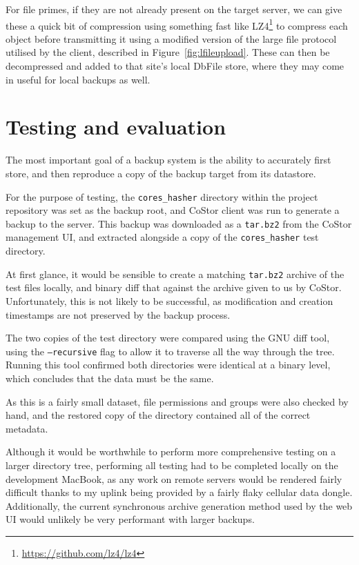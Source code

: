 \documentclass[bsc,frontabs,twoside,singlespacing,parskip,deptreport]{infthesis}     %
\begin{document}
For file primes, if they are not already present on the target server, we can give these a quick bit
of compression using something fast like LZ4\footnote{\url{https://github.com/lz4/lz4}} to compress
each object before transmitting it using a modified version of the large file protocol utilised by
the client, described in Figure~\ref{fig:lfileupload}. These can then be decompressed and added to that
site's local DbFile store, where they may come in useful for local backups as well.

\chapter{Testing and evaluation}

The most important goal of a backup system is the ability to accurately first store, and then reproduce
a copy of the backup target from its datastore.

For the purpose of testing, the \texttt{cores\_hasher} directory within the project repository was set
as the backup root, and CoStor client was run to generate a backup to the server. This backup was 
downloaded as a \texttt{tar.bz2} from the CoStor management UI, and extracted alongside a copy of
the \texttt{cores\_hasher} test directory.

At first glance, it would be sensible to create a matching \texttt{tar.bz2} archive of the test files
locally, and binary diff that against the archive given to us by CoStor. Unfortunately, this is not
likely to be successful, as modification and creation timestamps are not preserved by the backup 
process.

The two copies of the test directory were compared using the GNU diff tool, using the \texttt{--recursive}
flag to allow it to traverse all the way through the tree. Running this tool confirmed both
directories were identical at a binary level, which concludes that the data must be the same.

As this is a fairly small dataset, file permissions and groups were also checked by hand, and
the restored copy of the directory contained all of the correct metadata.

Although it would be worthwhile to perform more comprehensive testing on a larger directory tree,
performing all testing had to be completed locally on the development MacBook, as any work on
remote servers would be rendered fairly difficult thanks to my uplink being provided by a fairly flaky
cellular data dongle. Additionally, the current synchronous archive generation method used by the web
UI would unlikely be very performant with larger backups.
\end{document}
